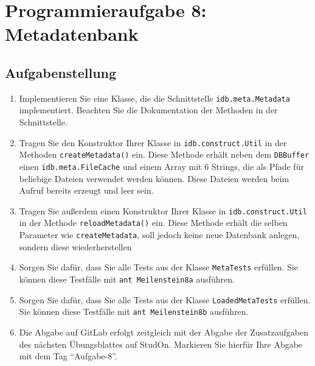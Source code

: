 \section{Programmieraufgabe 8: Metadatenbank}

\subsection{Aufgabenstellung}
\begin{enumerate}
	\item Implementieren Sie eine Klasse, die die Schnittstelle \beamertxt{\linebreak}\texttt{idb.meta.Metadata} implementiert.
		Beachten Sie die Dokumentation der Methoden in der Schnittstelle.
	\item Tragen Sie den Konstruktor Ihrer Klasse in \texttt{idb.construct.Util} in der Methoden \texttt{createMetadata()} ein.
		Diese Methode erhält neben dem \texttt{DBBuffer} einen \texttt{idb.meta.FileCache} und einem Array mit 6 Strings, die als Pfade für beliebige Dateien verwendet werden können.
		Diese Dateien werden beim Aufruf bereits erzeugt und leer sein.
	\item Tragen Sie außerdem einen Konstruktor Ihrer Klasse in \texttt{idb.construct.Util} in der Methode \texttt{reloadMetadata()} ein.
		Diese Methode erhält die selben Parameter wie \texttt{createMetadata}, soll jedoch keine neue Datenbank anlegen, sondern diese wiederherstellen
	\item Sorgen Sie dafür, dass Sie alle Tests aus der Klasse \texttt{MetaTests} erfüllen.
	Sie können diese Testfälle mit \lstinline|ant Meilenstein8a| ausführen.
	\item Sorgen Sie dafür, dass Sie alle Tests aus der Klasse \texttt{LoadedMetaTests} erfüllen.
	Sie können diese Testfälle mit \lstinline|ant Meilenstein8b| ausführen.
	\item Die Abgabe auf GitLab erfolgt zeitgleich mit der Abgabe der Zusatzaufgaben des nächsten Übungsblattes auf StudOn. Markieren Sie hierfür Ihre Abgabe mit dem Tag "`Aufgabe-8"'.
\end{enumerate}

